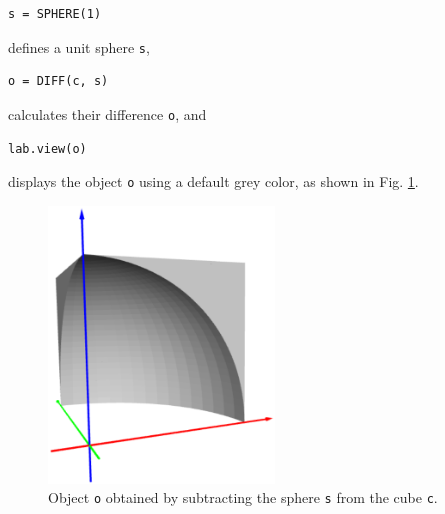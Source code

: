 \begin{bbox}
\begin{verbatim}
s = SPHERE(1)
\end{verbatim}
\end{bbox}
\vspace{6mm}

\noindent
\noindent
defines a unit sphere {\tt s},\\

\begin{bbox}
\begin{verbatim}
o = DIFF(c, s)
\end{verbatim}
\end{bbox}
\vspace{6mm}

\noindent
calculates their difference {\tt o}, and\\

\begin{bbox}
\begin{verbatim}
lab.view(o)
\end{verbatim}
\end{bbox}
\vspace{6mm}

\noindent
displays the object {\tt o} using a default grey color,
as shown in Fig. \ref{fig:diffcube}.
\newpage

\begin{figure}[!ht]
\begin{center}
\includegraphics[width=6cm]{img/sph-cube-111.png}
\end{center}
\vspace{-6mm}
\caption{Object {\tt o} obtained by subtracting the sphere {\tt s} from the cube {\tt c}.}
\label{fig:diffcube}
\end{figure}

